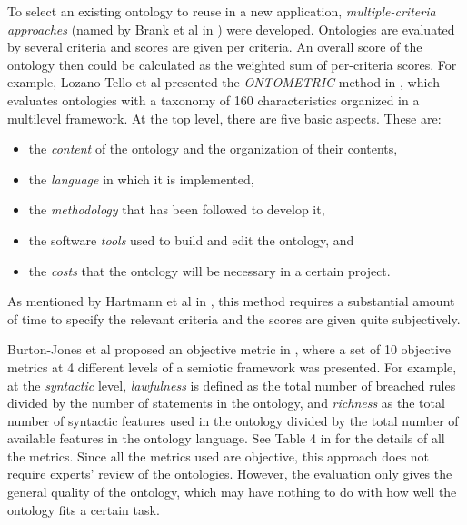To select an existing ontology to reuse in a new application, \emph{multiple-criteria approaches} (named by Brank et al in \cite{brank2005survey}) were developed. Ontologies are evaluated by several criteria and scores are given per criteria. An overall score of the ontology then could be calculated as the weighted sum of per-criteria scores. For example, Lozano-Tello et al presented the \emph{ONTOMETRIC} method in \cite{lozano2003selection,lozano2004ontometric}, which evaluates ontologies with a taxonomy of
160 characteristics organized in a multilevel framework. At the top level, there are five basic aspects. These are: 
\begin{itemize}
	\item the \emph{content} of the ontology and the
	organization of their contents,
	\item the \emph{language}
	in which it is implemented, 
	\item the \emph{methodology}
	that has been followed to develop it,
	\item the software \emph{tools} used to build and edit
	the ontology, and 
	\item the \emph{costs} that the ontology
	will be necessary in a certain project.
\end{itemize} 
As mentioned by Hartmann et al in \cite{hartmann2005d1}, this method requires a substantial amount of time to specify the relevant criteria and the scores are given quite subjectively.

Burton-Jones et al proposed an objective metric in \cite{burton2005semiotic}, where a set of 10 objective metrics at 4 different levels of a semiotic framework was presented. For example, at the \emph{syntactic} level, \emph{lawfulness} is defined as the total number of breached rules divided by the number of statements in the ontology, and \emph{richness} as the total number of syntactic features used in the ontology divided by the total number of available features in the ontology language. See Table 4 in \cite{burton2005semiotic} for the details of all the metrics. Since all the metrics used are objective, this approach does not require experts' review of the ontologies. However, the evaluation only gives the general quality of the ontology, which may have nothing to do with how well the ontology fits a certain task.

